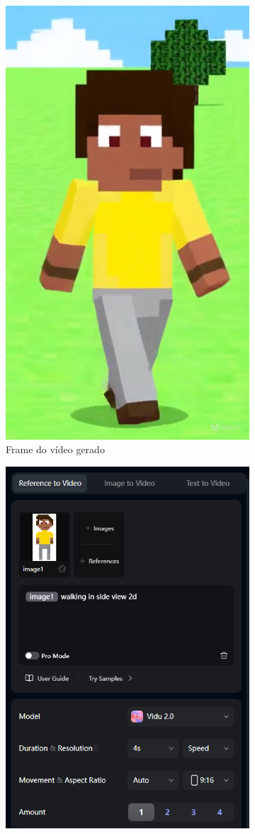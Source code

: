 \begin{figure}[htbp]
\begin{subfigure}{0.2\linewidth}
        \includegraphics[width=1\linewidth]{figs/vidu/frame1.jpg}
        \caption{\small Frame do vídeo gerado}
        \label{fig:vidu1b}
    \end{subfigure}
    \begin{subfigure}{0.75\linewidth}
        \centering
        \includegraphics[width=0.4\linewidth]{figs/vidu/tela2_real.PNG}

\end{subfigure}
\end{figure}
